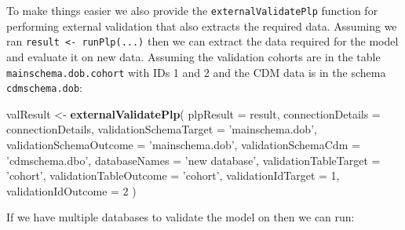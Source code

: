 \documentclass[11pt]{book}
\newenvironment{Shaded}{\begin{snugshade}}{\end{snugshade}}
\newcommand{\DataTypeTok}[1]{\textcolor[rgb]{0.13,0.29,0.53}{#1}}
\newcommand{\DecValTok}[1]{\textcolor[rgb]{0.00,0.00,0.81}{#1}}
\newcommand{\KeywordTok}[1]{\textcolor[rgb]{0.13,0.29,0.53}{\textbf{#1}}}
\newcommand{\NormalTok}[1]{#1}
\newcommand{\StringTok}[1]{\textcolor[rgb]{0.31,0.60,0.02}{#1}}
\theoremstyle{definition}
\theoremstyle{definition}
\theoremstyle{definition}
\theoremstyle{remark}
\begin{document}
To make things easier we also provide the \texttt{externalValidatePlp} function for performing external validation that also extracts the required data. Assuming we ran \texttt{result\ \textless{}-\ runPlp(...)} then we can extract the data required for the model and evaluate it on new data. Assuming the validation cohorts are in the table \texttt{mainschema.dob.cohort} with IDs 1 and 2 and the CDM data is in the schema \texttt{cdmschema.dob}:

\begin{Shaded}
\begin{Highlighting}[]
\NormalTok{valResult <-}\StringTok{ }\KeywordTok{externalValidatePlp}\NormalTok{(}
    \DataTypeTok{plpResult =}\NormalTok{ result, }
    \DataTypeTok{connectionDetails =}\NormalTok{ connectionDetails,}
    \DataTypeTok{validationSchemaTarget =} \StringTok{'mainschema.dob'}\NormalTok{,}
    \DataTypeTok{validationSchemaOutcome =} \StringTok{'mainschema.dob'}\NormalTok{,}
    \DataTypeTok{validationSchemaCdm =} \StringTok{'cdmschema.dbo'}\NormalTok{,}
    \DataTypeTok{databaseNames =} \StringTok{'new database'}\NormalTok{,}
    \DataTypeTok{validationTableTarget =} \StringTok{'cohort'}\NormalTok{,}
    \DataTypeTok{validationTableOutcome =} \StringTok{'cohort'}\NormalTok{,}
    \DataTypeTok{validationIdTarget =} \DecValTok{1}\NormalTok{,}
    \DataTypeTok{validationIdOutcome =} \DecValTok{2}
\NormalTok{)}
\end{Highlighting}
\end{Shaded}

If we have multiple databases to validate the model on then we can run:
\end{document}
